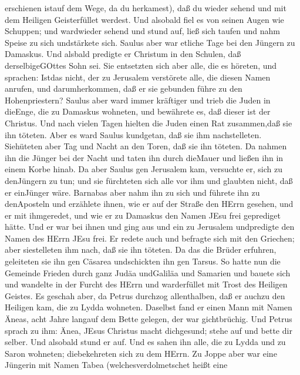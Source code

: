 erschienen istauf dem Wege, da du herkamest), daß du wieder sehend und
mit dem Heiligen Geisterfüllet werdest.  Und alsobald fiel
es von seinen Augen wie Schuppen; und wardwieder sehend 
und stund auf, ließ sich taufen und nahm Speise zu sich undstärkete
sich. Saulus aber war etliche Tage bei den Jüngern zu Damaskus.
 Und alsbald predigte er Christum in den Schulen, daß
derselbigeGOttes Sohn sei.  Sie entsetzten sich aber alle,
die es höreten, und sprachen: Istdas nicht, der zu Jerusalem verstörete
alle, die diesen Namen anrufen, und darumherkommen, daß er sie gebunden
führe zu den Hohenpriestern?  Saulus aber ward immer
kräftiger und trieb die Juden in dieEnge, die zu Damaskus wohneten, und
bewährete es, daß dieser ist der Christus.  Und nach vielen
Tagen hielten die Juden einen Rat zusammen,daß sie ihn töteten.
 Aber es ward Saulus kundgetan, daß sie ihm nachstelleten.
Siehüteten aber Tag und Nacht an den Toren, daß sie ihn töteten.
 Da nahmen ihn die Jünger bei der Nacht und taten ihn durch
dieMauer und ließen ihn in einem Korbe hinab.  Da aber
Saulus gen Jerusalem kam, versuchte er, sich zu denJüngern zu tun; und
sie fürchteten sich alle vor ihm und glaubten nicht, daß er einJünger
wäre.  Barnabas aber nahm ihn zu sich und führete ihn zu
denAposteln und erzählete ihnen, wie er auf der Straße den HErrn
gesehen, und er mit ihmgeredet, und wie er zu Damaskus den Namen JEsu
frei geprediget hätte.  Und er war bei ihnen und ging aus
und ein zu Jerusalem undpredigte den Namen des HErrn JEsu frei.
 Er redete auch und befragte sich mit den Griechen; aber
siestelleten ihm nach, daß sie ihn töteten.  Da das die
Brüder erfuhren, geleiteten sie ihn gen Cäsarea undschickten ihn gen
Tarsus.  So hatte nun die Gemeinde Frieden durch ganz Judäa
undGaliläa und Samarien und bauete sich und wandelte in der Furcht des
HErrn und warderfüllet mit Trost des Heiligen Geistes.  Es
geschah aber, da Petrus durchzog allenthalben, daß er auchzu den
Heiligen kam, die zu Lydda wohneten.  Daselbst fand er
einen Mann mit Namen Äneas, acht Jahre langauf dem Bette gelegen, der
war gichtbrüchig.  Und Petrus sprach zu ihm: Änea, JEsus
Christus macht dichgesund; stehe auf und bette dir selber. Und alsobald
stund er auf.  Und es sahen ihn alle, die zu Lydda und zu
Saron wohneten; diebekehreten sich zu dem HErrn.  Zu Joppe
aber war eine Jüngerin mit Namen Tabea (welchesverdolmetschet heißt eine
